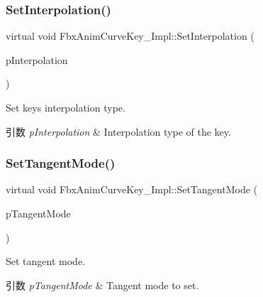 \subsubsection{\texorpdfstring{Set\+Interpolation()}{SetInterpolation()}}
{\footnotesize\ttfamily virtual void Fbx\+Anim\+Curve\+Key\+\_\+\+Impl\+::\+Set\+Interpolation (\begin{DoxyParamCaption}\item[{\hyperlink{class_fbx_anim_curve_def_add2ab7d10d856ab0868cc9b143d59ea5}{Fbx\+Anim\+Curve\+Def\+::\+E\+Interpolation\+Type}}]{p\+Interpolation }\end{DoxyParamCaption})\hspace{0.3cm}{\ttfamily [pure virtual]}}

Set key\textquotesingle{}s interpolation type. 
\begin{DoxyParams}{引数}
{\em p\+Interpolation} & Interpolation type of the key. \\
\hline
\end{DoxyParams}
\mbox{\label{class_fbx_anim_curve_key___impl_ac98a07a459c9dabde1a2e4b8da0feb75}} 
\subsubsection{\texorpdfstring{Set\+Tangent\+Mode()}{SetTangentMode()}}
{\footnotesize\ttfamily virtual void Fbx\+Anim\+Curve\+Key\+\_\+\+Impl\+::\+Set\+Tangent\+Mode (\begin{DoxyParamCaption}\item[{\hyperlink{class_fbx_anim_curve_def_ac810ccc5ca0527704ab5175479964b87}{Fbx\+Anim\+Curve\+Def\+::\+E\+Tangent\+Mode}}]{p\+Tangent\+Mode }\end{DoxyParamCaption})\hspace{0.3cm}{\ttfamily [pure virtual]}}

Set tangent mode. 
\begin{DoxyParams}{引数}
{\em p\+Tangent\+Mode} & Tangent mode to set. \\
\hline
\end{DoxyParams}
\mbox{\label{class_fbx_anim_curve_key___impl_afa3315cc9dad3459b8eb4abc3c7dae3e}} 
